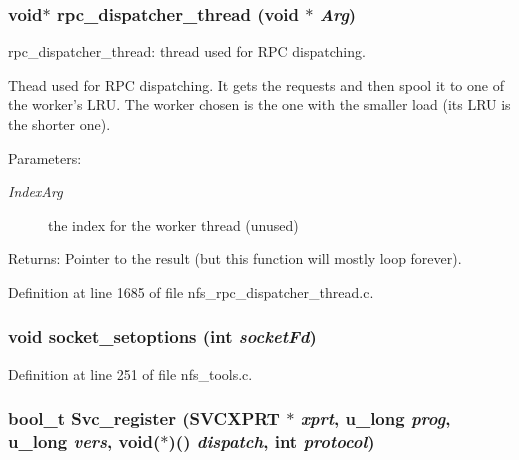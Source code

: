 \subsubsection[{rpc\_\-dispatcher\_\-thread}]{\setlength{\rightskip}{0pt plus 5cm}void$\ast$ rpc\_\-dispatcher\_\-thread (void $\ast$ {\em Arg})}\label{nfs__rpc__dispatcher__thread_8c_9e303488e5f50b512b89ba77ef8553e4}


rpc\_\-dispatcher\_\-thread: thread used for RPC dispatching.

Thead used for RPC dispatching. It gets the requests and then spool it to one of the worker's LRU. The worker chosen is the one with the smaller load (its LRU is the shorter one).

\begin{Desc}
\item[Parameters:]
\begin{description}
\item[{\em IndexArg}]the index for the worker thread (unused)\end{description}
\end{Desc}
\begin{Desc}
\item[Returns:]Pointer to the result (but this function will mostly loop forever). \end{Desc}


Definition at line 1685 of file nfs\_\-rpc\_\-dispatcher\_\-thread.c.
\subsubsection[{socket\_\-setoptions}]{\setlength{\rightskip}{0pt plus 5cm}void socket\_\-setoptions (int {\em socketFd})}\label{nfs__rpc__dispatcher__thread_8c_724cb81161f478d63c680f3e1f3f3a62}




Definition at line 251 of file nfs\_\-tools.c.
\subsubsection[{Svc\_\-register}]{\setlength{\rightskip}{0pt plus 5cm}bool\_\-t Svc\_\-register (SVCXPRT $\ast$ {\em xprt}, \/  u\_\-long {\em prog}, \/  u\_\-long {\em vers}, \/  void($\ast$)() {\em dispatch}, \/  int {\em protocol})}\label{nfs__rpc__dispatcher__thread_8c_dceb1bd7fe39115fff57535f517f5d3e}




